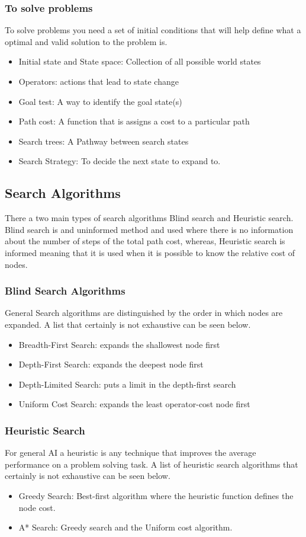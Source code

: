 \subsubsection{To solve problems}
To solve problems you need a set of initial conditions that will help define what a optimal and valid solution to the problem is.
\begin{itemize}
    \item Initial state and State space: Collection of all possible world states
    \item Operators: actions that lead to state change
    \item Goal test: A way to identify the goal state(s)
    \item Path cost: A function that is assigns a cost to a particular path
    \item Search trees: A Pathway between search states
    \item Search Strategy: To decide the next state to expand to.
\end{itemize}

\subsection{Search Algorithms}
There a two main types of search algorithms Blind search and Heuristic search. Blind search is and uninformed method and used where there is no information about the number of steps of the total path cost, whereas, Heuristic search is informed meaning that it is used when it is possible to know the relative cost of nodes.
\subsubsection{Blind Search Algorithms}
General Search algorithms are distinguished by the order in which nodes are expanded. A list that certainly is not exhaustive can be seen below.
\begin{itemize}
    \item Breadth-First Search: expands the shallowest node first
    \item Depth-First Search: expands the deepest node first
    \item Depth-Limited Search: puts a limit in the depth-first search
    \item Uniform Cost Search: expands the least operator-cost node first
\end{itemize}
\subsubsection{Heuristic Search}
For general AI a heuristic is any technique that improves the average performance on a problem solving task. A list of heuristic search algorithms that certainly is not exhaustive can be seen below.
\begin{itemize}
    \item Greedy Search: Best-first algorithm where the heuristic function defines the node cost.
    \item A* Search: Greedy search and the Uniform cost algorithm.
\end{itemize}
